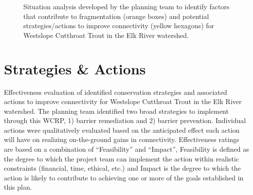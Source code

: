 \documentclass[
  letterpaper,
  DIV=11,
  numbers=noendperiod]{scrreprt}
\begin{document}
\begin{figure}


\caption{\label{fig-sitan}Situation analysis developed by the planning
team to identify factors that contribute to fragmentation (orange boxes)
and potential strategies/actions to improve connectivity (yellow
hexagons) for Westslope Cutthroat Trout in the Elk River watershed.}

\end{figure}%

\section*{Strategies \& Actions}\label{strategies-actions}


Effectiveness evaluation of identified conservation strategies and
associated actions to improve connectivity for Westslope Cutthroat Trout
in the Elk River watershed. The planning team identified two broad
strategies to implement through this WCRP, 1) barrier remediation and 2)
barrier prevention. Individual actions were qualitatively evaluated
based on the anticipated effect each action will have on realizing
on-the-ground gains in connectivity. Effectiveness ratings are based on
a combination of ``Feasibility'' and ``Impact'', Feasibility is defined
as the degree to which the project team can implement the action within
realistic constraints (financial, time, ethical, etc.) and Impact is the
degree to which the action is likely to contribute to achieving one or
more of the goals established in this plan.
\end{document}

